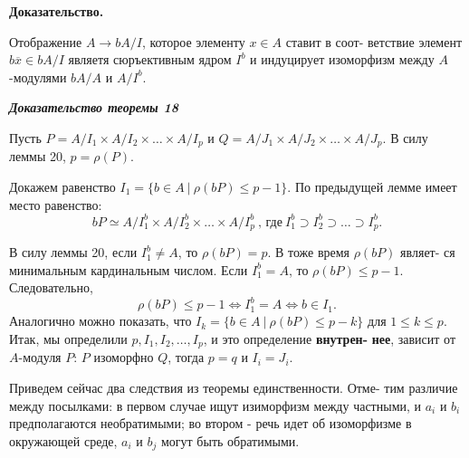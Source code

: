 \documentclass{mai_book}
\begin{document}
	{\bf Доказательство.}
	
	Отображение $A \rightarrow bA/I$, которое элементу $x \in A$ ставит в соот-\linebreak
	ветствие элемент $b\overline{x} \in bA/I$ являетя сюръективным ядром $I^{b}$ и
	индуцирует изоморфизм между $A$-модулями $bA/A$ и $A/I^{b}.$
	
	{\it {\bf Доказательство теоремы 18}}
	
	Пусть $P = A/I_{1} \times A/I_{2} \times \ldots \times A/I_{p}$ и $Q = A/J_{1} \times A/J_{2} \times \ldots \times A/J_{p}.$\linebreak
	В силу леммы 20, $p = \rho (P)$.
	
	Докажем равенство $I_{1} = \{ b \in A \ | \ \rho (bP) \leqslant p - 1\} .$ По предыдущей\linebreak
	лемме имеет место равенство:
	$$bP \simeq A/I^{b}_{1} \times A/I^{b}_{2} \times \ldots \times A/I^{b}_{p} \ \text{, где} \ I^{b}_{1} \supset I^{b}_{2} \supset \ldots \supset I^{b}_{p}. $$
	
	\pagebreak

	В силу леммы 20, если $I^{b}_{1} \neq A$, то $\rho (bP) = p$. В тоже время $\rho (bP)$ являет-\linebreak
	ся минимальным кардинальным числом. Если $I^{b}_{1} = A$, то $\rho (bP) \leqslant p - 1$.\linebreak
	Следовательно,
	$$\rho (bP) \leqslant p - 1 \Longleftrightarrow I^{b}_{1} = A \Longleftrightarrow b \in I_{1}.$$
	Аналогично можно показать, что $I_{k} = \{b \in A \ | \ \rho (bP) \leqslant p - k \}$ для\linebreak
	$1 \leqslant k \leqslant p$.\newline
	Итак, мы определили $p, I_{1}, I_{2}, \ldots, I_{p}$, и это определение {\bf внутрен-}\linebreak
	{\bf нее}, зависит от $A$-модуля $P$: $P$ изоморфно $Q$, тогда $p = q$ и $I_{i} = J_{i}$.
	
	Приведем сейчас два следствия из теоремы единственности. Отме-\linebreak
	тим различие между посылками: в первом случае ищут изиморфизм\linebreak
	между частными, и $a_{i}$ и $b_{i}$ предполагаются необратимыми; во втором\linebreak
	- речь идет об изоморфизме в окружающей среде, $a_{i}$ и $b_{j}$ могут быть\linebreak
	обратимыми.
	
\end{document}
